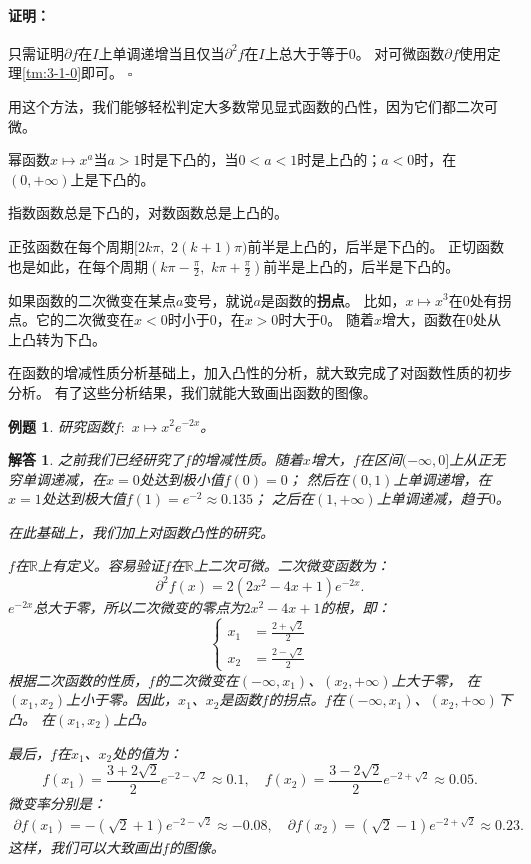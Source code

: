 \documentclass[12pt,UTF8]{ctexbook}
\renewenvironment{proof}{\paragraph{\textbf{证明：}}}{\hfill$\square$}
\newtheorem{et}{例题}[section]
\newtheorem*{so}{解答}
\begin{document}
\begin{proof}
    只需证明$\partial f$在$I$上单调递增当且仅当$\partial^2 f$在$I$上总大于等于$0$。
    对可微函数$\partial f$使用定理\ref{tm:3-1-0}即可。
\end{proof}

用这个方法，我们能够轻松判定大多数常见显式函数的凸性，因为它们都二次可微。

幂函数$x\mapsto x^a$当$a>1$时是下凸的，当$0<a<1$时是上凸的；$a<0$时，在$(0,+\infty)$上是下凸的。

指数函数总是下凸的，对数函数总是上凸的。

正弦函数在每个周期$[2k\pi, \,\, 2(k+1)\pi)$前半是上凸的，后半是下凸的。
正切函数也是如此，在每个周期$(k\pi-\frac{\pi}{2}, \,\, k\pi+\frac{\pi}{2})$前半是上凸的，后半是下凸的。

如果函数的二次微变在某点$a$变号，就说$a$是函数的\textbf{拐点}。
比如，$x\mapsto x^3$在$0$处有拐点。它的二次微变在$x<0$时小于$0$，在$x>0$时大于$0$。
随着$x$增大，函数在$0$处从上凸转为下凸。

在函数的增减性质分析基础上，加入凸性的分析，就大致完成了对函数性质的初步分析。
有了这些分析结果，我们就能大致画出函数的图像。

\begin{et}
    研究函数$f:\,\,x\mapsto x^2 e^{-2x}$。
\end{et}

\begin{so}

    之前我们已经研究了$f$的增减性质。随着$x$增大，$f$在区间$(-\infty, 0]$上从正无穷单调递减，在$x = 0$处达到极小值$f(0) = 0$；
    然后在$(0, 1)$上单调递增，在$x = 1$处达到极大值$f(1) = e^{-2} \approx 0.135$；
    之后在$(1, +\infty)$上单调递减，趋于$0$。

    在此基础上，我们加上对函数凸性的研究。

    $f$在$\mathbb{R}$上有定义。容易验证$f$在$\mathbb{R}$上二次可微。二次微变函数为：
    $$ \partial^2 f (x) = 2(2x^2 - 4x + 1)e^{-2x}.$$
    $e^{-2x}$总大于零，所以二次微变的零点为$2x^2 - 4x + 1$的根，即：
    $$  
        \left\{ 
            \begin{array}{cl}
                x_1 &= \frac{2 + \sqrt{2}}{2} \\
                x_2 &= \frac{2 - \sqrt{2}}{2} 
            \end{array}
        \right.
    $$
    根据二次函数的性质，$f$的二次微变在$(-\infty, x_1)$、$(x_2, +\infty)$上大于零，
    在$(x_1, x_2)$上小于零。因此，$x_1$、$x_2$是函数$f$的拐点。$f$在$(-\infty, x_1)$、$(x_2, +\infty)$下凸。
    在$(x_1, x_2)$上凸。

    最后，$f$在$x_1$、$x_2$处的值为：
    $$ f(x_1) = \frac{3 + 2\sqrt{2}}{2} e^{-2-\sqrt{2}} \approx 0.1, \quad f(x_2) = \frac{3 - 2\sqrt{2}}{2} e^{-2+\sqrt{2}} \approx 0.05. $$
    微变率分别是：
    \begin{align*}
        \partial f(x_1) = -(\sqrt{2} + 1)e^{-2-\sqrt{2}} \approx -0.08, \quad  \partial f(x_2) = (\sqrt{2} - 1)e^{-2+\sqrt{2}} \approx 0.23. 
    \end{align*}
    这样，我们可以大致画出$f$的图像。
\end{so}
\end{document}
